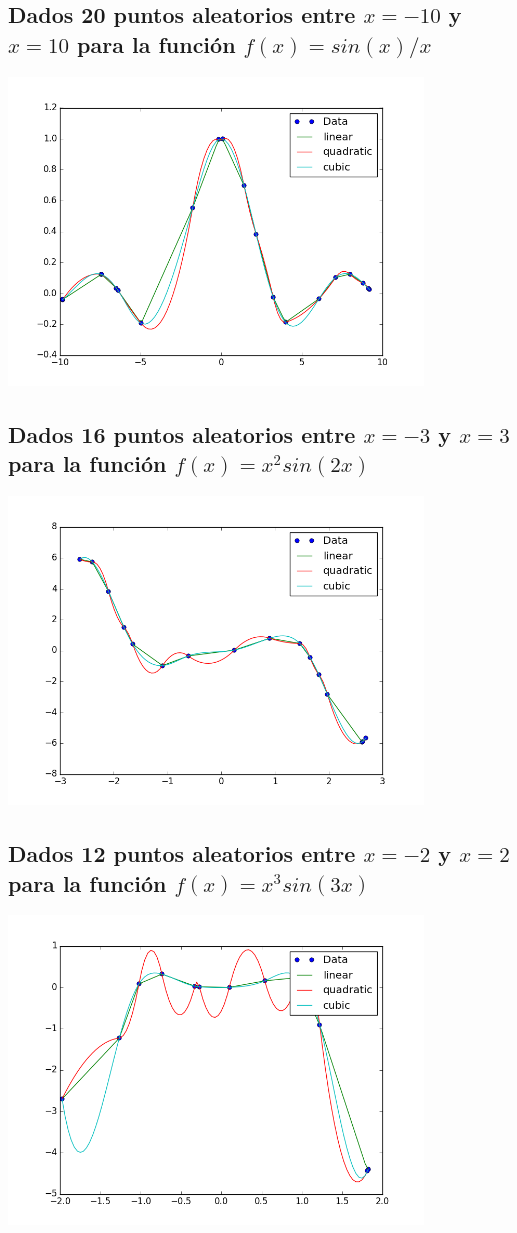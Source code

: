 \documentclass[a4paper]{article}
\begin{document}
\subsection{Dados 20 puntos aleatorios entre $x=-10$ y $x=10$ para la función $f(x) = sin(x)/x $}
\includegraphics[width=11cm]{figure_2}
\\
\subsection{Dados 16 puntos aleatorios entre $x=-3$ y $x=3$ para la función $f(x) = x^2 sin(2 x)$}
\includegraphics[width=11cm]{figure_3}
\\
\subsection{Dados 12 puntos aleatorios entre $x=-2$ y $x=2$ para la función $f(x) = x^3 sin(3 x)$}
\includegraphics[width=11cm]{figure_4}
\end{document}

